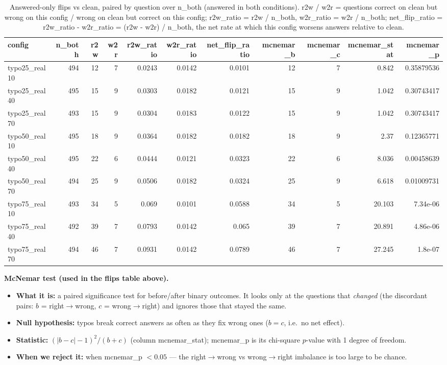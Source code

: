\documentclass[11pt]{article}
\begin{document}
\begin{table}[H]
\centering
\caption{Answered-only flips vs clean, paired by question over n\_both (answered in both conditions). r2w / w2r = questions correct on clean but wrong on this config / wrong on clean but correct on this config; r2w\_ratio = r2w / n\_both, w2r\_ratio = w2r / n\_both; net\_flip\_ratio = r2w\_ratio - w2r\_ratio = (r2w - w2r) / n\_both, the net rate at which this config worsens answers relative to clean.}
\small
\begin{adjustbox}{max width=\textwidth}
\begin{tabular}{lrrrrrrrrrr}
\toprule
\textbf{config} & \textbf{n\_both} & \textbf{r2w} & \textbf{w2r} & \textbf{r2w\_ratio} & \textbf{w2r\_ratio} & \textbf{net\_flip\_ratio} & \textbf{mcnemar\_b} & \textbf{mcnemar\_c} & \textbf{mcnemar\_stat} & \textbf{mcnemar\_p} \\
\midrule
typo25\_real10 & 494 & 12 & 7 & 0.0243 & 0.0142 & 0.0101 & 12 & 7 & 0.842 & 0.35879536 \\
typo25\_real40 & 495 & 15 & 9 & 0.0303 & 0.0182 & 0.0121 & 15 & 9 & 1.042 & 0.30743417 \\
typo25\_real70 & 493 & 15 & 9 & 0.0304 & 0.0183 & 0.0122 & 15 & 9 & 1.042 & 0.30743417 \\
typo50\_real10 & 495 & 18 & 9 & 0.0364 & 0.0182 & 0.0182 & 18 & 9 & 2.37 & 0.12365771 \\
typo50\_real40 & 495 & 22 & 6 & 0.0444 & 0.0121 & 0.0323 & 22 & 6 & 8.036 & 0.00458639 \\
typo50\_real70 & 494 & 25 & 9 & 0.0506 & 0.0182 & 0.0324 & 25 & 9 & 6.618 & 0.01009731 \\
typo75\_real10 & 493 & 34 & 5 & 0.069 & 0.0101 & 0.0588 & 34 & 5 & 20.103 & 7.34e-06 \\
typo75\_real40 & 492 & 39 & 7 & 0.0793 & 0.0142 & 0.065 & 39 & 7 & 20.891 & 4.86e-06 \\
typo75\_real70 & 494 & 46 & 7 & 0.0931 & 0.0142 & 0.0789 & 46 & 7 & 27.245 & 1.8e-07 \\
\bottomrule
\end{tabular}
\end{adjustbox}
\end{table}

\medskip
\noindent\textbf{McNemar test (used in the flips table above).}
\begin{itemize}\setlength{\itemsep}{1pt}
  \item \textbf{What it is:} a paired significance test for before/after binary
  outcomes. It looks only at the questions that \emph{changed} (the discordant pairs:
  $b$ = right$\to$wrong, $c$ = wrong$\to$right) and ignores those that stayed the same.
  \item \textbf{Null hypothesis:} typos break correct answers as often as they fix
  wrong ones ($b = c$, i.e.\ no net effect).
  \item \textbf{Statistic:} $(|b - c| - 1)^2 / (b + c)$ (column mcnemar\_stat);
  mcnemar\_p is its chi-square $p$-value with 1 degree of freedom.
  \item \textbf{When we reject it:} when mcnemar\_p $< 0.05$ --- the
  right$\to$wrong vs wrong$\to$right imbalance is too large to be chance.
\end{itemize}
\end{document}
